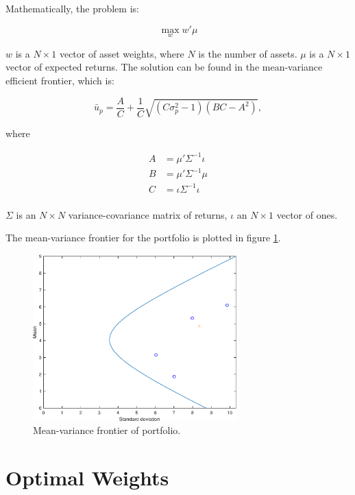 \documentclass[a4paper]{article}
\begin{document}
Mathematically, the problem is:

\begin{equation*}
    \max_{w} w'\mu
\end{equation*}

\(w\) is a \(N\times1\) vector of asset weights, where \(N\) is the number of assets. $\mu$ is a \(N\times1\) vector of expected returns. The solution can be found in the mean-variance efficient frontier, which is:

\begin{equation*}
    \bar{u}_p = \frac{A}{C} + \frac{1}{C} \sqrt{(C\sigma^2_p - 1)(BC - A^2)},
\end{equation*}

where

\begin{align*}
    A &= \mu'\Sigma^{-1}\iota  \\
    B &= \mu'\Sigma^{-1}\mu    \\
    C &= \iota\Sigma^{-1}\iota \\
\end{align*}

$\Sigma$ is an \(N\times N\) variance-covariance matrix of returns, $\iota$ an \(N\times 1\) vector of ones.

The mean-variance frontier for the portfolio is plotted in figure \ref{figure_mv_frontier}.

\begin{figure}[H]
    \centering
    \includegraphics[width=0.7\textwidth, keepaspectratio]{generated_mv_frontier.eps}
    \caption{Mean-variance frontier of portfolio.}
    \label{figure_mv_frontier}
\end{figure}

\section{Optimal Weights}
\end{document}
